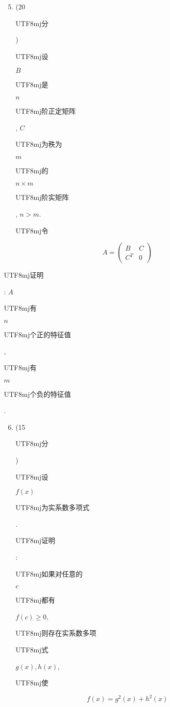 \documentclass[10pt]{article}
\begin{document}
\begin{enumerate}
  \setcounter{enumi}{4}
  \item (20 \begin{CJK}{UTF8}{mj}分\end{CJK}) \begin{CJK}{UTF8}{mj}设\end{CJK} $B$ \begin{CJK}{UTF8}{mj}是\end{CJK} $n$ \begin{CJK}{UTF8}{mj}阶正定矩阵\end{CJK}, $C$ \begin{CJK}{UTF8}{mj}为秩为\end{CJK} $m$ \begin{CJK}{UTF8}{mj}的\end{CJK} $n \times m$ \begin{CJK}{UTF8}{mj}阶实矩阵\end{CJK}, $n>m$. \begin{CJK}{UTF8}{mj}令\end{CJK}
\end{enumerate}
$$
A=\left(\begin{array}{cc}
B & C \\
C^{T} & 0
\end{array}\right)
$$
\begin{CJK}{UTF8}{mj}证明\end{CJK}: $A$ \begin{CJK}{UTF8}{mj}有\end{CJK} $n$ \begin{CJK}{UTF8}{mj}个正的特征值\end{CJK}, \begin{CJK}{UTF8}{mj}有\end{CJK} $m$ \begin{CJK}{UTF8}{mj}个负的特征值\end{CJK}.

\begin{enumerate}
  \setcounter{enumi}{5}
  \item (15 \begin{CJK}{UTF8}{mj}分\end{CJK}) \begin{CJK}{UTF8}{mj}设\end{CJK} $f(x)$ \begin{CJK}{UTF8}{mj}为实系数多项式\end{CJK}. \begin{CJK}{UTF8}{mj}证明\end{CJK}: \begin{CJK}{UTF8}{mj}如果对任意的\end{CJK} $c$ \begin{CJK}{UTF8}{mj}都有\end{CJK} $f(c) \geqslant 0$, \begin{CJK}{UTF8}{mj}则存在实系数多项\end{CJK} \begin{CJK}{UTF8}{mj}式\end{CJK} $g(x), h(x)$, \begin{CJK}{UTF8}{mj}使\end{CJK}
\end{enumerate}
$$
f(x)=g^{2}(x)+h^{2}(x)
$$
\end{document}
